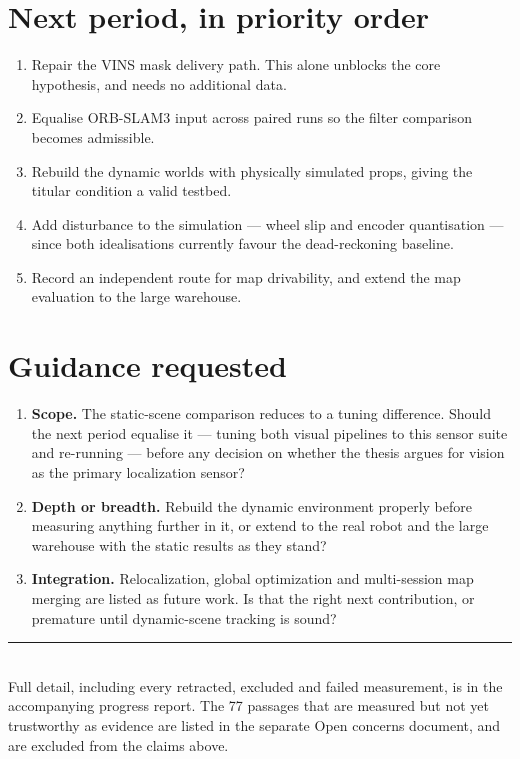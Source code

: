 \documentclass[11pt,a4paper]{article}
\begin{document}
\section{Next period, in priority order}

\begin{enumerate}[leftmargin=2.2em]
  \item Repair the VINS mask delivery path. This alone unblocks the core
    hypothesis, and needs no additional data.
  \item Equalise ORB-SLAM3 input across paired runs so the filter comparison
    becomes admissible.
  \item Rebuild the dynamic worlds with physically simulated props, giving the
    titular condition a valid testbed.
  \item Add disturbance to the simulation --- wheel slip and encoder
    quantisation --- since both idealisations currently favour the
    dead-reckoning baseline.
  \item Record an independent route for map drivability, and extend the map
    evaluation to the large warehouse.
\end{enumerate}

\section{Guidance requested}

\begin{enumerate}[leftmargin=2.2em]
  \item \textbf{Scope.} The static-scene comparison reduces to a tuning
    difference. Should the next period equalise it --- tuning both visual
    pipelines to this sensor suite and re-running --- before any decision on
    whether the thesis argues for vision as the primary localization sensor?
  \item \textbf{Depth or breadth.} Rebuild the dynamic environment properly
    before measuring anything further in it, or extend to the real robot and the
    large warehouse with the static results as they stand?
  \item \textbf{Integration.} Relocalization, global optimization and
    multi-session map merging are listed as future work. Is that the right next
    contribution, or premature until dynamic-scene tracking is sound?
\end{enumerate}

\vspace{0.4em}
\noindent\rule{\textwidth}{0.4pt}\\[0.2em]
\footnotesize Full detail, including every retracted, excluded and failed
measurement, is in the accompanying progress report. The 77 passages that are
measured but not yet trustworthy as evidence are listed in the separate Open
concerns document, and are excluded from the claims above.
\end{document}
